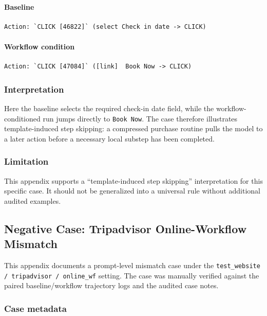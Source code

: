 \paragraph{Baseline}

\begin{verbatim}
Action: `CLICK [46822]` (select Check in date -> CLICK)
\end{verbatim}

\paragraph{Workflow condition}

\begin{verbatim}
Action: `CLICK [47084]` ([link]  Book Now -> CLICK)
\end{verbatim}

\subsubsection{Interpretation}

Here the baseline selects the required check-in date field, while the
workflow-conditioned run jumps directly to \texttt{Book Now}. The case
therefore illustrates template-induced step skipping: a compressed
purchase routine pulls the model to a later action before a necessary
local substep has been completed.

\subsubsection{Limitation}

This appendix supports a ``template-induced step skipping''
interpretation for this specific case. It should not be generalized into
a universal rule without additional audited examples.


\clearpage
\subsection{Negative Case: Tripadvisor Online-Workflow Mismatch}\label{app:B6}

This appendix documents a prompt-level mismatch case under the
\texttt{test\_website / tripadvisor / online\_wf} setting. The case was
manually verified against the paired baseline/workflow trajectory logs
and the audited case notes.

\subsubsection{Case metadata}

